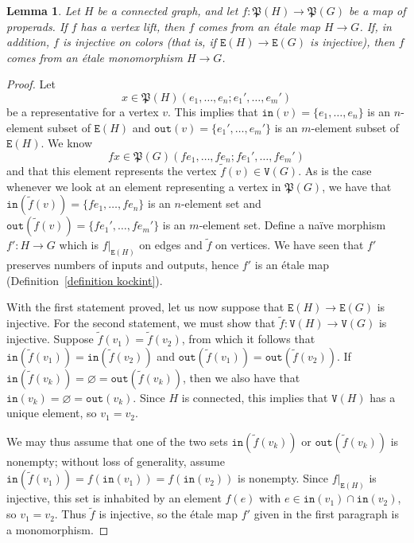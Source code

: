 \documentclass{amsart}
\numberwithin{theorem}{subsection}
\newtheorem{lemma}[theorem]{Lemma}
\theoremstyle{definition}
\newcommand{\out}{\mathtt{out}}
\newcommand{\inp}{\mathtt{in}}
\newcommand{\edge}{\mathtt{E}}
\newcommand{\vertex}{\mathtt{V}}
\begin{document}
\begin{lemma}
\label{lemma inj colors to etale mono}
Let $H$ be a connected graph, and let $f  : \mathfrak{P}(H) \to \mathfrak{P}(G)$ be a map of properads.
If $f$ has a vertex lift, then $f$ comes from an \'etale map $H \to G$.
If, in addition, $f$ is injective on colors (that is, if $\edge(H) \to \edge(G)$ is injective), then $f$ comes from an \'etale monomorphism $H\to G$.
\end{lemma}
\begin{proof}
Let
\[
	x \in \mathfrak{P}(H)(e_1, \dots, e_n; e_1', \dots, e_m')
\]
be a representative for a vertex $v$.
This implies that $\inp(v) = \{ e_1, \dots, e_n \}$ is an $n$-element subset of $\edge(H)$ and $\out(v) = \{ e_1', \dots, e_m' \}$ is an $m$-element subset of $\edge(H)$.
We know
\[
	fx \in  \mathfrak{P}(G)(fe_1, \dots, fe_n; fe_1', \dots, fe_m')
\]
and that this element represents the vertex $\widetilde f (v) \in \vertex(G)$.
As is the case whenever we look at an element representing a vertex in $\mathfrak{P}(G)$, we have that $\inp(\widetilde f (v)) = \{ fe_1, \dots, fe_n \}$ is an $n$-element set and $\out(\widetilde f (v)) = \{ fe_1', \dots, fe_m' \}$ is an $m$-element set.
Define a na\"ive morphism $f' : H\to G$ which is $f|_{\edge(H)}$ on edges and $\widetilde f$ on vertices.
We have seen that $f'$ preserves numbers of inputs and outputs, hence $f'$ is an \'etale map (Definition~\ref{definition kockint}).

With the first statement proved, let us now suppose that $\edge(H) \to \edge(G)$ is injective.
For the second statement, we must show that $\widetilde f : \vertex(H) \to \vertex(G)$ is injective.
Suppose $\widetilde f(v_1) = \widetilde f(v_2)$, from which it follows that $\inp(\widetilde f(v_1)) = \inp(\widetilde f(v_2))$ and $\out(\widetilde f(v_1)) = \out(\widetilde f(v_2))$.
If $\inp(\widetilde f(v_k)) = \varnothing = \out(\widetilde f(v_k))$, then we also have that $\inp(v_k) = \varnothing = \out(v_k)$.
Since $H$ is connected, this implies that $\vertex(H)$ has a unique element, so $v_1 = v_2$.

We may thus assume that one of the two sets $\inp(\widetilde f(v_k))$ or $\out(\widetilde f(v_k))$ is nonempty; without loss of generality, assume $\inp(\widetilde f(v_1)) = f(\inp(v_1)) = f(\inp(v_2))$ is nonempty.
Since $f|_{\edge(H)}$ is injective, this set is inhabited by an element $f(e)$ with $e\in \inp(v_1) \cap \inp(v_2)$, so $v_1=v_2$.
Thus $\widetilde f$ is injective, so the \'etale map $f'$ given in the first paragraph is a monomorphism.
\end{proof}
\end{document}
